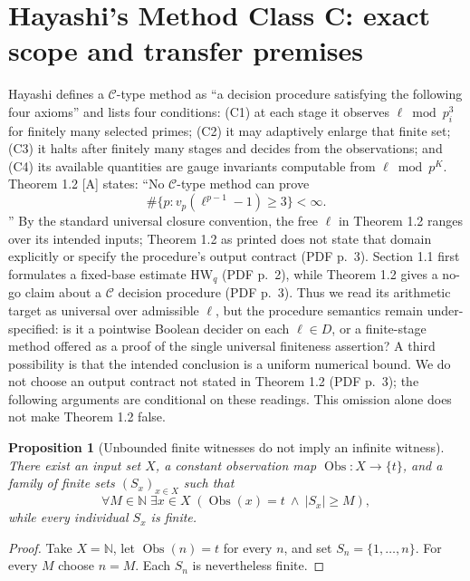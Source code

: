 \documentclass[11pt]{article}
\newtheorem{proposition}[theorem]{Proposition}
\begin{document}
\section{Hayashi's Method Class C: exact scope and transfer premises}\label{sec:hayashi}
Hayashi \cite[Definition 1.1 and Theorem 1.2, PDF p.~3]{Hayashi} defines a $\mathcal C$-type method as ``a decision procedure satisfying the following four axioms'' and lists four conditions: (C1) at each stage it observes $\ell\bmod p_i^3$ for finitely many selected primes; (C2) it may adaptively enlarge that finite set; (C3) it halts after finitely many stages and decides from the observations; and (C4) its available quantities are gauge invariants computable from $\ell\bmod p^K$. Theorem 1.2 [A] states: ``No $\mathcal C$-type method can prove
\[\#\{p:v_p(\ell^{p-1}-1)\geq3\}<\infty.\]''
By the standard universal closure convention, the free $\ell$ in Theorem 1.2 ranges over its intended inputs; Theorem 1.2 as printed does not state that domain explicitly or specify the procedure's output contract (PDF p.~3). Section 1.1 first formulates a fixed-base estimate $\mathrm{HW}_q$ (PDF p.~2), while Theorem 1.2 gives a no-go claim about a $\mathcal C$ decision procedure (PDF p.~3). Thus we read its arithmetic target as universal over admissible $\ell$, but the procedure semantics remain under-specified: is it a pointwise Boolean decider on each $\ell\in D$, or a finite-stage method offered as a proof of the single universal finiteness assertion? A third possibility is that the intended conclusion is a uniform numerical bound. We do not choose an output contract not stated in Theorem 1.2 (PDF p.~3); the following arguments are conditional on these readings. This omission alone does not make Theorem 1.2 false.

\begin{proposition}[Unbounded finite witnesses do not imply an infinite witness]\label{prop:finiteM}
There exist an input set $X$, a constant observation map $\operatorname{Obs}:X\to\{t\}$, and a family of finite sets $(S_x)_{x\in X}$ such that
\[\forall M\in\mathbb N\;\exists x\in X\;(\operatorname{Obs}(x)=t\ \wedge\ |S_x|\geq M),\]
while every individual $S_x$ is finite.
\end{proposition}
\begin{proof}
Take $X=\mathbb N$, let $\operatorname{Obs}(n)=t$ for every $n$, and set $S_n=\{1,\ldots,n\}$. For every $M$ choose $n=M$. Each $S_n$ is nevertheless finite.
\end{proof}
\end{document}
